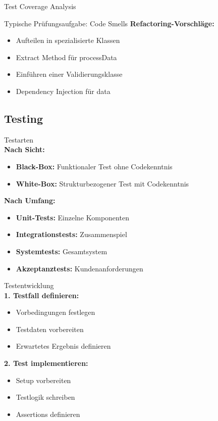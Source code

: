 \begin{example2}{Test Coverage Analysis}
\begin{example2}{Typische Prüfungsaufgabe: Code Smells}
\textbf{Refactoring-Vorschläge:}
\begin{itemize}
    \item Aufteilen in spezialisierte Klassen
    \item Extract Method für processData
    \item Einführen einer Validierungsklasse
    \item Dependency Injection für data
\end{itemize}
\end{example2}



\subsection{Testing}

\begin{definition}{Testarten}\\
\textbf{Nach Sicht:}
\begin{itemize}
    \item \textbf{Black-Box:} Funktionaler Test ohne Codekenntnis
    \item \textbf{White-Box:} Strukturbezogener Test mit Codekenntnis
\end{itemize}

\textbf{Nach Umfang:}
\begin{itemize}
    \item \textbf{Unit-Tests:} Einzelne Komponenten
    \item \textbf{Integrationstests:} Zusammenspiel
    \item \textbf{Systemtests:} Gesamtsystem
    \item \textbf{Akzeptanztests:} Kundenanforderungen
\end{itemize}
\end{definition}

\begin{KR}{Testentwicklung}\\
\textbf{1. Testfall definieren:}
\begin{itemize}
    \item Vorbedingungen festlegen
    \item Testdaten vorbereiten
    \item Erwartetes Ergebnis definieren
\end{itemize}

\textbf{2. Test implementieren:}
\begin{itemize}
    \item Setup vorbereiten
    \item Testlogik schreiben
    \item Assertions definieren
\end{itemize}


\end{KR}
\end{example2}
